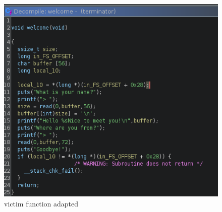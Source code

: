 \documentclass{report}
\begin{document}
    \begin{figure}
        \centering
        \includegraphics[width=1\linewidth]{terminator_rev2.png}
        \caption{victim function adapted}
        \label{fig:enter-label}
    \end{figure}
\end{document}
